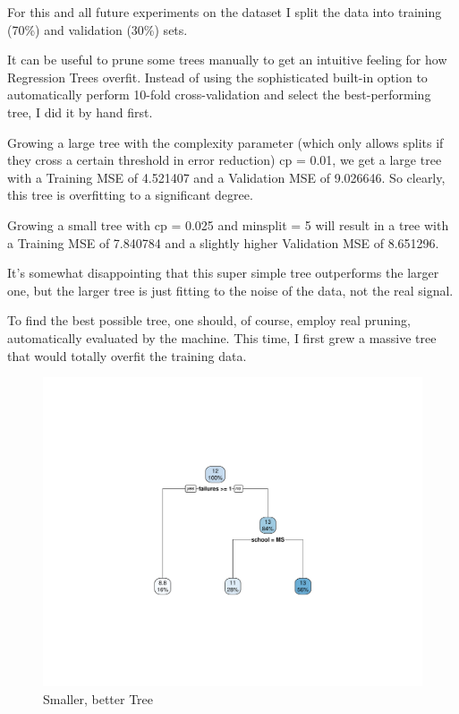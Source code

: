 \documentclass[12pt]{article}
\begin{document}
For this and all future experiments on the dataset I split the data into training (70\%) and validation (30\%) sets.

It can be useful to prune some trees manually to get an intuitive feeling for how Regression Trees overfit. Instead of using the sophisticated built-in option to automatically perform 10-fold cross-validation and select the best-performing tree, I did it by hand first.


Growing a large tree with the complexity parameter (which only allows splits if they cross a certain threshold in error reduction) cp = 0.01, we get a large tree with a Training MSE of 4.521407 and a Validation MSE of 9.026646. So clearly, this tree is overfitting to a significant degree.

Growing a small tree with cp = 0.025 and minsplit = 5 will result in a tree with a Training MSE of 7.840784 and a slightly higher Validation MSE of 8.651296.

It's somewhat disappointing that this super simple tree outperforms the larger one, but the larger tree is just fitting to the noise of the data, not the real signal.

To find the best possible tree, one should, of course, employ real pruning, automatically evaluated by the machine. This time, I first grew a massive tree that would totally overfit the training data.

\begin{figure}
    \centering
    \includegraphics[scale=0.30]{small_manual_tree.pdf}
    \caption{Smaller, better Tree}
\end{figure}
\end{document}

